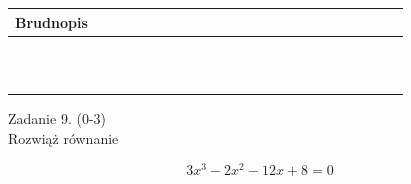 \documentclass[10pt]{article}
\begin{document}
\begin{center}
\begin{tabular}{|c|c|c|c|c|c|c|c|c|c|c|c|c|c|c|c|c|c|c|c|c|c|c|c|c|c|c|}
\hline
\multicolumn{5}{|l|}{Brudnopis} &  &  &  &  &  &  &  &  &  &  &  &  &  &  &  &  &  &  &  &  &  &  \\
\hline
 &  &  &  &  &  &  &  &  &  &  &  &  &  &  &  &  &  &  &  &  &  &  &  &  &  &  \\
\hline
 &  &  &  &  &  &  &  &  &  &  &  &  &  &  &  &  &  &  &  &  &  &  &  &  &  &  \\
\hline
 &  &  &  &  &  &  &  &  &  &  &  &  &  &  &  &  &  &  &  &  &  &  &  &  &  &  \\
\hline
 &  &  &  &  &  &  &  &  &  &  &  &  &  &  &  &  &  &  &  &  &  &  &  &  &  &  \\
\hline
 &  &  &  &  &  &  &  &  &  &  &  &  &  &  &  &  &  &  &  &  &  &  &  &  &  &  \\
\hline
 &  &  &  &  &  &  &  &  &  &  &  &  &  &  &  &  &  &  &  &  &  &  &  &  &  &  \\
\hline
 &  &  &  &  &  &  &  &  &  &  &  &  &  &  &  &  &  &  &  &  &  &  &  &  &  &  \\
\hline
 &  &  &  &  &  &  &  &  &  &  &  &  &  &  &  &  &  &  &  &  &  &  &  &  &  &  \\
\hline
 &  &  &  &  &  &  &  &  &  &  &  &  &  &  &  &  &  &  &  &  &  &  &  &  &  &  \\
\hline
 &  &  &  &  &  &  &  &  &  &  &  &  &  &  &  &  &  &  &  &  &  &  &  &  &  &  \\
\hline
 &  &  &  &  &  &  &  &  &  &  &  &  &  &  &  &  &  &  &  &  &  &  &  &  &  &  \\
\hline
\end{tabular}
\end{center}

Zadanie 9. (0-3)\\
Rozwiąż równanie

\[
3 x^{3}-2 x^{2}-12 x+8=0
\]
\end{document}
